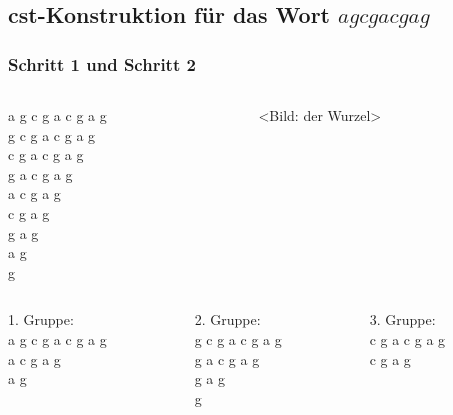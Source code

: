 \documentclass{beamer}
\begin{document}

\subsection{cst-Konstruktion für das Wort $agcgacgag$}


\begin{frame}[t]
\frametitle{Schritt 1 und Schritt 2}
\begin{columns}
    \begin{column}[t]{0.47\textwidth}
        a g c g a c g a g   \\
        g c g a c g a g     \\
        c g a c g a g       \\
        g a c g a g         \\
        a c g a g           \\
        c g a g             \\
        g a g               \\
        a g                 \\
        g                   \\
    \end{column}
    \begin{column}[t]{0.47\textwidth}
        <Bild: der Wurzel>
    \end{column}
\end{columns}
\medskip
\begin{columns}
    \begin{column}[t]{0.3\textwidth}
        1. Gruppe:          \\
        a g c g a c g a g   \\
        a c g a g           \\
        a g                 \\
    \end{column}
    \begin{column}[t]{0.3\textwidth}
        2. Gruppe:      \\
        g c g a c g a g \\
        g a c g a g     \\
        g a g           \\
        g               \\
    \end{column}
    \begin{column}[t]{0.3\textwidth}
        3. Gruppe:      \\
        c g a c g a g   \\
        c g a g         \\
    \end{column}
\end{columns}
\end{frame}
\end{document}
